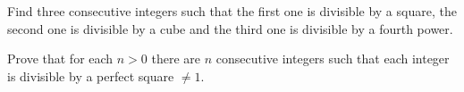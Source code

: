 \begin{exercise}
\label{xca:consecutive}
	Find three consecutive integers such that the first one is divisible by a square, 
	the second one is divisible by a cube and the third one is divisible by a fourth power. 	
\end{exercise}

\begin{exercise}
\label{xca:perfect_square}
	Prove that 
	for each $n>0$ there are $n$ consecutive integers such that 
	each integer is divisible by a perfect square $\ne 1$. 	
\end{exercise}


